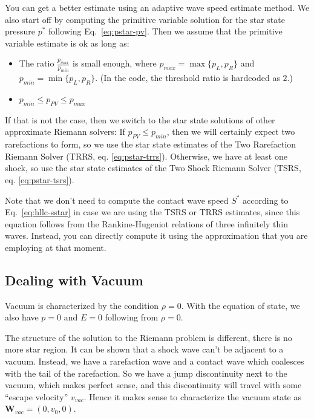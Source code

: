 You can get a better estimate using an adaptive wave speed estimate method.
We also start off by computing the primitive variable solution for the star
state pressure $p^*$ following Eq.~\ref{eq:pstar-pv}.
Then we assume that the primitive variable estimate is ok as long as:
%
%
\begin{itemize}
\item The ratio $\frac{p_{max}}{p_{min}}$ is small enough, where
	$p_{max} = \max \{ p_L, p_R \}$ and
	$p_{min} = \min \{ p_L, p_R \}$.
	(In the code, the threshold ratio is hardcoded as $2$.)
\item $p_{min} \leq p_{PV} \leq p_{max}$
\end{itemize}
%
%
If that is not the case, then we switch to the star state solutions of other
approximate Riemann solvers: If $p_{PV} \leq p_{min}$, then we will certainly
expect two rarefactions to form, so we use the star state estimates of the Two
Rarefaction Riemann Solver (TRRS, eq. \ref{eq:pstar-trrs}).
Otherwise, we have at least one shock, so use the star state estimates of the
Two Shock Riemann Solver (TSRS, eq. \ref{eq:pstar-tsrs}).




Note that we don't need to compute the contact wave speed $S^*$ according to
Eq.~\ref{eq:hllc-sstar} in case we are using the TSRS or TRRS estimates, since
this equation follows from the Rankine-Hugeniot relations of three infinitely
thin waves. Instead, you can directly compute it using the approximation that
you are employing at that moment.










\subsection{Dealing with Vacuum}


Vacuum is characterized by the condition $\rho = 0$. With the equation of
state, we also have $p = 0$ and $E = 0$ following from $\rho = 0$.

The structure of the solution to the Riemann problem is different, there is no
more star region. It can be shown that a shock wave can't be adjacent to a
vacuum. Instead, we have a rarefaction wave and a contact wave which coalesces
with the tail of the rarefaction. So we have a jump discontinuity next to the
vacuum, which makes perfect sense, and this discontinuity will travel with some
``escape velocity'' $v_{vac}$.
Hence it makes sense to characterize the vacuum state as
$\mathbf{W}_{vac} = (0, v_0, 0)$.

